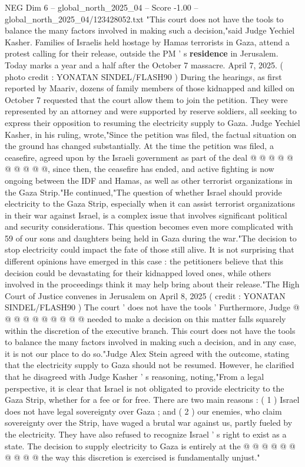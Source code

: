 \begin{textsample}{NEG Dim 6 – global\_north\_2025\_04 – Score -1.00 – global\_north\_2025\_04/123428052.txt}  \label{ex:f6_neg_261}
"This court does not have the tools to balance the many factors involved in making such a decision,"said Judge Yechiel Kasher.
Families of Israelis held hostage by Hamas terrorists in Gaza, attend a protest calling for their release, outside the PM ' s \textbf{residence} in Jerusalem.
Today marks a year and a half after the October 7 massacre.
April 7, 2025. ( photo credit : YONATAN SINDEL/FLASH90 ) During the hearings, as first reported by Maariv, dozens of family members of those kidnapped and killed on October 7 requested that the court allow them to join the petition.
They were represented by an attorney and were supported by reserve soldiers, all seeking to express their opposition to resuming the electricity supply to Gaza.
Judge Yechiel Kasher, in his ruling, wrote,"Since the petition was filed, the factual situation on the ground has changed substantially.
At the time the petition was filed, a ceasefire, agreed upon by the Israeli government as part of the deal @ @ @ @ @ @ @ @ @ @, since then, the ceasefire has ended, and active fighting is now ongoing between the IDF and Hamas, as well as other terrorist organizations in the Gaza Strip."He continued,"The question of whether Israel should provide electricity to the Gaza Strip, especially when it can assist terrorist organizations in their war against Israel, is a complex issue that involves significant political and security considerations.
This question becomes even more complicated with 59 of our sons and daughters being held in Gaza during the war."The decision to stop electricity could impact the fate of those still alive.
It is not surprising that different opinions have emerged in this case : the petitioners believe that this decision could be devastating for their kidnapped loved ones, while others involved in the proceedings think it may help bring about their release."The High Court of Justice convenes in Jerusalem on April 8, 2025 ( credit : YONATAN SINDEL/FLASH90 ) The court ' does not have the tools ' Furthermore, Judge @ @ @ @ @ @ @ @ @ @ needed to make a decision on this matter falls squarely within the discretion of the executive branch.
This court does not have the tools to balance the many factors involved in making such a decision, and in any case, it is not our place to do so."Judge Alex Stein agreed with the outcome, stating that the electricity supply to Gaza should not be resumed.
However, he clarified that he disagreed with Judge Kasher ' s reasoning, noting,"From a legal perspective, it is clear that Israel is not obligated to provide electricity to the Gaza Strip, whether for a fee or for free.
There are two main reasons : ( 1 ) Israel does not have legal sovereignty over Gaza ; and ( 2 ) our enemies, who claim sovereignty over the Strip, have waged a brutal war against us, partly fueled by the electricity.
They have also refused to recognize Israel ' s right to exist as a state.
The decision to supply electricity to Gaza is entirely at the @ @ @ @ @ @ @ @ @ @ the way this discretion is exercised is fundamentally unjust."

\end{textsample}
